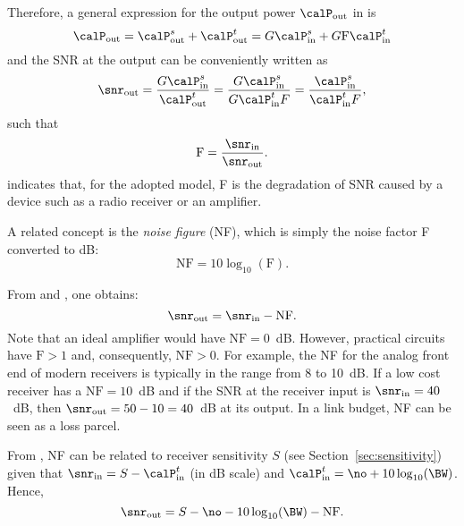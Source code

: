 Therefore, a general expression for the output power $\calP_{\textrm{out}}$ in  is
\begin{equation}
\calP_{\textrm{out}} = \calP_{\textrm{out}}^{s} + \calP_{\textrm{out}}^{t} = G \calP_{\textrm{in}}^{s} + G \textrm{F} \calP_{\textrm{in}}^{t}
\label{eq:amplifierOutputPower}
\end{equation}
and
the SNR at the output can be conveniently written as
\begin{equation}
\snr_{\textrm{out}} = \frac{G\calP_{\textrm{in}}^{s}}{\calP_{\textrm{out}}^{t}} = \frac{G\calP_{\textrm{in}}^{s}}{G \calP_{\textrm{in}}^{t}F} = \frac{\calP_{\textrm{in}}^{s}}{\calP_{\textrm{in}}^{t}F},
\label{eq:snrInTermsOfF}
\end{equation}
such that
\begin{equation}
\textrm{F}  = \frac{\snr_{\textrm{in}}}{\snr_{\textrm{out}}}.
\label{eq:noiseFactor2}
\end{equation}
 indicates that, for the adopted model, F is the degradation of SNR caused by a device such as a radio receiver or an amplifier. 

A related concept is the \emph{noise figure} (NF), which is simply the noise factor F converted to dB:
\begin{equation}
\textrm{NF} = 10 \log_{10} \left( \textrm{F} \right).
\label{eq:noiseFigure2}
\end{equation}

From  and , one obtains:
\begin{equation}
\snr_{\textrm{out}} = \snr_{\textrm{in}} - \textrm{NF}.
\label{eq:noiseFigure3}
\end{equation}
Note that an ideal amplifier would have $\textrm{NF}=0$~dB. However, practical circuits have $\textrm{F} > 1$ and, consequently, $\textrm{NF}> 0$.
For example, the NF for the analog front end of modern receivers is typically in the range from 8 to 10~dB. If a low cost receiver has a $\textrm{NF}=10$~dB and if the SNR at the receiver input is $\snr_{\textrm{in}}=40$~dB, then $\snr_{\textrm{out}}=50-10=40$~dB at its output. In a link budget, NF can 
be seen as a loss parcel.

From , NF can be related to receiver sensitivity $S$ (see Section~\ref{sec:sensitivity}) given that $\snr_{\textrm{in}}=S - \calP_{\textrm{in}}^{t}$ (in dB scale) and 
$\calP_{\textrm{in}}^{t} = \no + 10\log_{10}(\BW)$. Hence,
\begin{equation}
\snr_{\textrm{out}} = S -\no - 10\log_{10}(\BW) - \textrm{NF}.
\label{eq:nf_sensitivity}
\end{equation}

